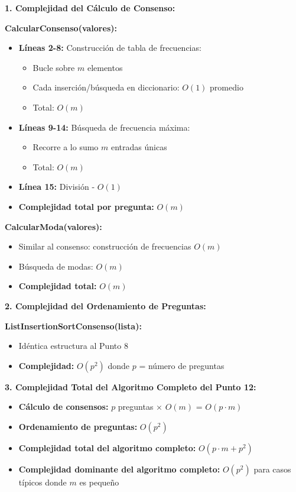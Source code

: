 \documentclass[11pt,a4paper]{article}
\begin{document}
\textbf{1. Complejidad del Cálculo de Consenso:}

\textbf{CalcularConsenso(valores):}
\begin{itemize}[label=\textbullet]
\item \textbf{Líneas 2-8:} Construcción de tabla de frecuencias:
  \begin{itemize}
  \item Bucle sobre $m$ elementos
  \item Cada inserción/búsqueda en diccionario: $O(1)$ promedio
  \item Total: $O(m)$
  \end{itemize}
\item \textbf{Líneas 9-14:} Búsqueda de frecuencia máxima:
  \begin{itemize}
  \item Recorre a lo sumo $m$ entradas únicas
  \item Total: $O(m)$
  \end{itemize}
\item \textbf{Línea 15:} División - $O(1)$
\item \textbf{Complejidad total por pregunta:} $O(m)$
\end{itemize}

\textbf{CalcularModa(valores):}
\begin{itemize}[label=\textbullet]
\item Similar al consenso: construcción de frecuencias $O(m)$
\item Búsqueda de modas: $O(m)$
\item \textbf{Complejidad total:} $O(m)$
\end{itemize}

\textbf{2. Complejidad del Ordenamiento de Preguntas:}

\textbf{ListInsertionSortConsenso(lista):}
\begin{itemize}[label=\textbullet]
\item Idéntica estructura al Punto 8
\item \textbf{Complejidad:} $O(p^2)$ donde $p$ = número de preguntas
\end{itemize}

\textbf{3. Complejidad Total del Algoritmo Completo del Punto 12:}

\begin{itemize}[label=\textbullet]
\item \textbf{Cálculo de consensos:} $p$ preguntas × $O(m)$ = $O(p \cdot m)$
\item \textbf{Ordenamiento de preguntas:} $O(p^2)$
\item \textbf{Complejidad total del algoritmo completo:} $O(p \cdot m + p^2)$
\item \textbf{Complejidad dominante del algoritmo completo:} $O(p^2)$ para casos típicos donde $m$ es pequeño
\end{itemize}
\end{document}
